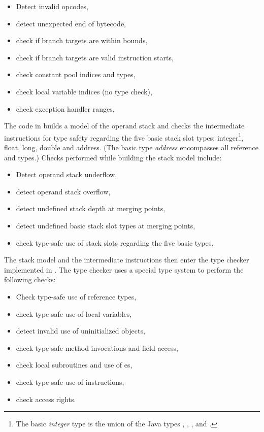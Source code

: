 \begin{itemize}
\item Detect invalid opcodes,
\item detect unexpected end of bytecode,
\item check if branch targets are within bounds,
\item check if branch targets are valid instruction starts,
\item check constant pool indices and types,
\item check local variable indices (no type check),
\item check exception handler ranges.
\end{itemize}

The code in  builds a model of the operand stack
and checks the intermediate instructions for type safety regarding the
five basic stack slot types: integer\footnote{The basic \emph{integer}
type is the union of the Java types , ,
,  and .}, float, long, double and
address. (The basic type \emph{address} encompasses all reference and
 types.) Checks performed while building the stack
model include:

\begin{itemize}
\item Detect operand stack underflow,
\item detect operand stack overflow,
\item detect undefined stack depth at merging points,
\item detect undefined basic stack slot types at merging points,
\item check type-safe use of stack slots regarding the five basic
      types.
\end{itemize}

The stack model and the intermediate instructions then enter the type
checker implemented in . The type checker
uses a special type system to perform the following checks:

\begin{itemize}
\item Check type-safe use of reference types,
\item check type-safe use of local variables,
\item detect invalid use of uninitialized objects,
\item check type-safe method invocations and field access,
\item check local subroutines and use of es,
\item check type-safe use of  instructions,
\item check access rights.
\end{itemize}

